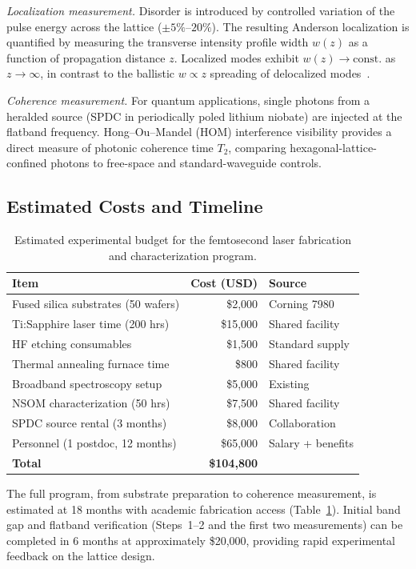 \documentclass[10pt,letterpaper]{article}
\begin{document}
\textit{Localization measurement.} Disorder is introduced by controlled variation of the pulse energy across the lattice ($\pm 5\%$--$20\%$). The resulting Anderson localization is quantified by measuring the transverse intensity profile width $w(z)$ as a function of propagation distance $z$. Localized modes exhibit $w(z) \to \mathrm{const.}$ as $z \to \infty$, in contrast to the ballistic $w \propto z$ spreading of delocalized modes~\cite{Pertsch2002,Wiersma1997}.

\textit{Coherence measurement.} For quantum applications, single photons from a heralded source (SPDC in periodically poled lithium niobate) are injected at the flatband frequency. Hong--Ou--Mandel (HOM) interference visibility provides a direct measure of photonic coherence time $T_2$, comparing hexagonal-lattice-confined photons to free-space and standard-waveguide controls.

\subsection{Estimated Costs and Timeline}

\begin{table}[h]
\centering
\caption{Estimated experimental budget for the femtosecond laser fabrication and characterization program.}
\label{tab:budget}
\begin{tabular}{lrl}
\toprule
\textbf{Item} & \textbf{Cost (USD)} & \textbf{Source} \\
\midrule
Fused silica substrates (50 wafers) & \$2,000 & Corning 7980 \\
Ti:Sapphire laser time (200 hrs) & \$15,000 & Shared facility \\
HF etching consumables & \$1,500 & Standard supply \\
Thermal annealing furnace time & \$800 & Shared facility \\
Broadband spectroscopy setup & \$5,000 & Existing \\
NSOM characterization (50 hrs) & \$7,500 & Shared facility \\
SPDC source rental (3 months) & \$8,000 & Collaboration \\
Personnel (1 postdoc, 12 months) & \$65,000 & Salary + benefits \\
\midrule
\textbf{Total} & \textbf{\$104,800} & \\
\bottomrule
\end{tabular}
\end{table}

The full program, from substrate preparation to coherence measurement, is estimated at 18 months with academic fabrication access (Table~\ref{tab:budget}). Initial band gap and flatband verification (Steps~1--2 and the first two measurements) can be completed in 6 months at approximately \$20,000, providing rapid experimental feedback on the lattice design.
\end{document}
